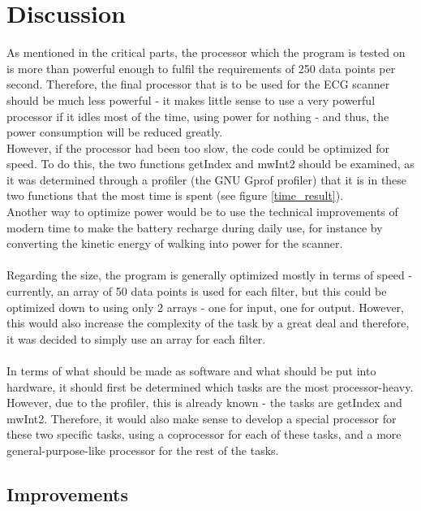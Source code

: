 \documentclass[12pt,a4paper]{article}
\begin{document}
\section{Discussion}
	As mentioned in the critical parts, the processor which the program is tested on is more than powerful enough to fulfil the requirements of 250 data points per second. Therefore, the final processor that is to be used for the ECG scanner should be much less powerful - it makes little sense to use a very powerful processor if it idles most of the time, using power for nothing - and thus, the power consumption will be reduced greatly.\\
	However, if the processor had been too slow, the code could be optimized for speed. To do this, the two functions getIndex and mwInt2 should be examined, as it was determined through a profiler (the GNU Gprof profiler) that it is in these two functions that the most time is spent (see figure \ref{time_result}).\\
	Another way to optimize power would be to use the technical improvements of modern time to make the battery recharge during daily use, for instance by converting the kinetic energy of walking into power for the scanner.\\
	\\
	Regarding the size, the program is generally optimized mostly in terms of speed - currently, an array of 50 data points is used for each filter, but this could be optimized down to using only 2 arrays - one for input, one for output. However, this would also increase the complexity of the task by a great deal and therefore, it was decided to simply use an array for each filter.\\
	\\
	In terms of what should be made as software and what should be put into hardware, it should first be determined which tasks are the most processor-heavy. However, due to the profiler, this is already known - the tasks are getIndex and mwInt2. Therefore, it would also make sense to develop a special processor for these two specific tasks, using a coprocessor for each of these tasks, and a more general-purpose-like processor for the rest of the tasks.\\
	
\subsection{Improvements}
	
\end{document}
